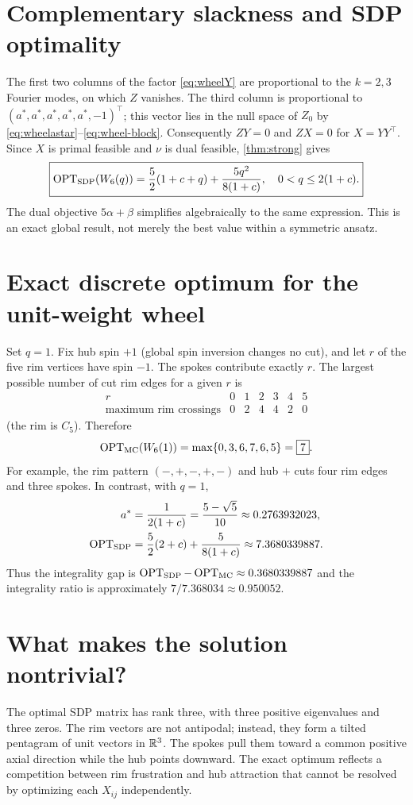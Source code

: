\section{Complementary slackness and SDP optimality}
The first two columns of the factor \eqref{eq:wheelY} are proportional to the $k=2,3$ Fourier modes, on which $Z$ vanishes. The third column is proportional to $(a^*,a^*,a^*,a^*,a^*,-1)^\top$; this vector lies in the null space of $Z_0$ by \eqref{eq:wheelastar}--\eqref{eq:wheel-block}. Consequently $ZY=0$ and $ZX=0$ for $X=YY^\top$. Since $X$ is primal feasible and $\nu$ is dual feasible, \cref{thm:strong} gives
\begin{equation}\label{eq:wheel-optimal}
\boxed{\operatorname{OPT}_{\mathrm{SDP}}(W_6(q))=\frac52(1+c+q)+\frac{5q^2}{8(1+c)},\quad 0<q\le2(1+c).}
\end{equation}
The dual objective $5\alpha+\beta$ simplifies algebraically to the same expression. This is an exact global result, not merely the best value within a symmetric ansatz.

\section{Exact discrete optimum for the unit-weight wheel}
Set $q=1$. Fix hub spin $+1$ (global spin inversion changes no cut), and let $r$ of the five rim vertices have spin $-1$. The spokes contribute exactly $r$. The largest possible number of cut rim edges for a given $r$ is
\[
\begin{array}{c|rrrrrr}
r&0&1&2&3&4&5\\\hline
\text{maximum rim crossings}&0&2&4&4&2&0
\end{array}
\]
(the rim is $C_5$). Therefore
\[
\operatorname{OPT}_{\mathrm{MC}}(W_6(1))=\max\{0,3,6,7,6,5\}=\boxed7.
\]
For example, the rim pattern $(-,+,-,+,-)$ and hub $+$ cuts four rim edges and three spokes. In contrast, with $q=1$,
\begin{align}
a^*&=\frac1{2(1+c)}=\frac{5-\sqrt5}{10}\approx0.2763932023,\\
\operatorname{OPT}_{\mathrm{SDP}}&=\frac52(2+c)+\frac5{8(1+c)}\approx7.3680339887.\label{eq:wheel-q1}
\end{align}
Thus the integrality gap is $\operatorname{OPT}_{\mathrm{SDP}}-\operatorname{OPT}_{\mathrm{MC}}\approx0.3680339887$ and the integrality ratio is approximately $7/7.368034\approx0.950052$.

\section{What makes the solution nontrivial?}
The optimal SDP matrix has rank three, with three positive eigenvalues and three zeros. The rim vectors are not antipodal; instead, they form a tilted pentagram of unit vectors in $\mathbb{R}^3$. The spokes pull them toward a common positive axial direction while the hub points downward. The exact optimum reflects a competition between rim frustration and hub attraction that cannot be resolved by optimizing each $X_{ij}$ independently.
